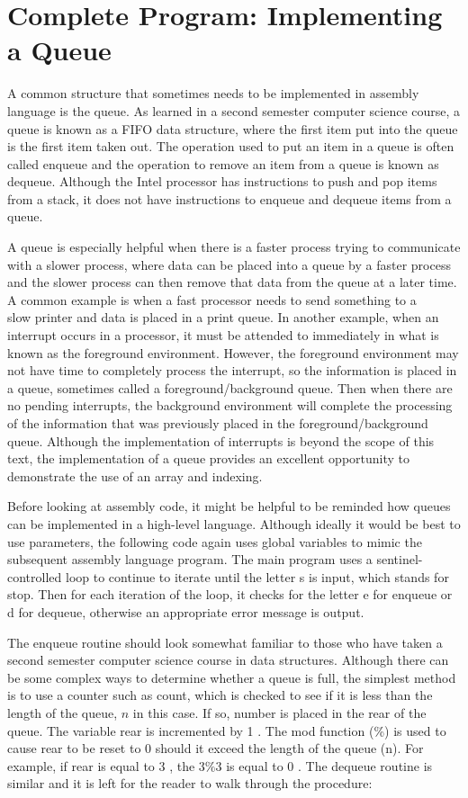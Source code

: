 \documentclass[10pt]{book}
\begin{document}
\section{Complete Program: Implementing a Queue}
A common structure that sometimes needs to be implemented in assembly language is the queue. As learned in a second semester computer science course, a queue is known as a FIFO data structure, where the first item put into the queue is the first item taken out. The operation used to put an item in a queue is often called enqueue and the operation to remove an item from a queue is known as dequeue. Although the Intel processor has instructions to push and pop items from a stack, it does not have instructions to enqueue and dequeue items from a queue.

A queue is especially helpful when there is a faster process trying to communicate with a slower process, where data can be placed into a queue by a faster process and the slower process can then remove that data from the queue at a later time. A common example is when a fast processor needs to send something to a\\
slow printer and data is placed in a print queue. In another example, when an interrupt occurs in a processor, it must be attended to immediately in what is known as the foreground environment. However, the foreground environment may not have time to completely process the interrupt, so the information is placed in a queue, sometimes called a foreground/background queue. Then when there are no pending interrupts, the background environment will complete the processing of the information that was previously placed in the foreground/background queue. Although the implementation of interrupts is beyond the scope of this text, the implementation of a queue provides an excellent opportunity to demonstrate the use of an array and indexing.


Before looking at assembly code, it might be helpful to be reminded how queues can be implemented in a high-level language. Although ideally it would be best to use parameters, the following code again uses global variables to mimic the subsequent assembly language program. The main program uses a sentinel-controlled loop to continue to iterate until the letter s is input, which stands for stop. Then for each iteration of the loop, it checks for the letter e for enqueue or d for dequeue, otherwise an appropriate error message is output.

The enqueue routine should look somewhat familiar to those who have taken a second semester computer science course in data structures. Although there can be some complex ways to determine whether a queue is full, the simplest method is to use a counter such as count, which is checked to see if it is less than the length of the queue, $n$ in this case. If so, number is placed in the rear of the queue. The variable rear is incremented by 1 . The mod function (\%) is used to cause rear to be reset to 0 should it exceed the length of the queue (n). For example, if rear is equal to 3 , the $3 \% 3$ is equal to 0 . The dequeue routine is similar and it is left for the reader to walk through the procedure:
\end{document}
